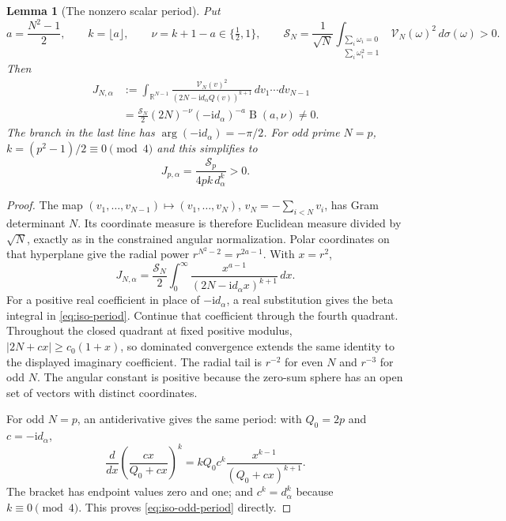\documentclass[11pt]{article}
\numberwithin{equation}{section}
\newtheorem{lemma}[theorem]{Lemma}
\theoremstyle{definition}
\newcommand{\R}{\mathbb R}
\newcommand{\ii}{\mathrm i}
\begin{document}
\begin{lemma}[The nonzero scalar period]
\label{lem:iso-period}
Put
\[
 a=\frac{N^2-1}{2},\qquad k=\lfloor a\rfloor,\qquad
 \nu=k+1-a\in\{\tfrac12,1\},\qquad
 \mathcal S_N=\frac1{\sqrt N}
      \int_{\substack{\sum_i\omega_i=0\\\sum_i\omega_i^2=1}}
           \mathcal V_N(\omega)^2\,d\sigma(\omega)>0.
\]
Then
\begin{align}
 J_{N,\alpha}
  &:=\int_{\R^{N-1}}
     \frac{\mathcal V_N(v)^2}
          {(2N-\ii d_\alpha Q(v))^{k+1}}\,dv_1\cdots dv_{N-1}
          \nonumber\\
  &=\frac{\mathcal S_N}{2}(2N)^{-\nu}
      (-\ii d_\alpha)^{-a}\operatorname B(a,\nu)\ne0.
                                      \label{eq:iso-period}
\end{align}
The branch in the last line has $\arg(-\ii d_\alpha)=-\pi/2$.
For odd prime $N=p$, $k=(p^2-1)/2\equiv0\pmod4$ and this simplifies to
\begin{equation}\label{eq:iso-odd-period}
 J_{p,\alpha}=\frac{\mathcal S_p}{4pk\,d_\alpha^k}>0.
\end{equation}
\end{lemma}
\begin{proof}
The map $(v_1,\ldots,v_{N-1})\mapsto(v_1,\ldots,v_N)$,
$v_N=-\sum_{i<N}v_i$, has Gram determinant $N$.
Its coordinate measure is therefore Euclidean measure divided by
$\sqrt N$, exactly as in the constrained angular normalization.
Polar coordinates on that hyperplane give the radial power
$r^{N^2-2}=r^{2a-1}$.  With $x=r^2$,
\[
 J_{N,\alpha}=\frac{\mathcal S_N}{2}
   \int_0^\infty\frac{x^{a-1}}{(2N-\ii d_\alpha x)^{k+1}}\,dx.
\]
For a positive real coefficient in place of $-\ii d_\alpha$,
a real substitution gives the beta integral in
\eqref{eq:iso-period}.  Continue that coefficient through the fourth
quadrant.  Throughout the closed quadrant at fixed positive modulus,
$|2N+cx|\ge c_0(1+x)$, so dominated convergence extends the same
identity to the displayed imaginary coefficient.  The radial tail
is $r^{-2}$ for even $N$ and $r^{-3}$ for odd $N$.
The angular constant is positive because the zero-sum sphere has
an open set of vectors with distinct coordinates.

For odd $N=p$, an antiderivative gives the same period:
with $Q_0=2p$ and $c=-\ii d_\alpha$,
\[
 \frac{d}{dx}\left(\frac{cx}{Q_0+cx}\right)^k
   =kQ_0c^k\frac{x^{k-1}}{(Q_0+cx)^{k+1}}.
\]
The bracket has endpoint values zero and one; and
$c^k=d_\alpha^k$ because $k\equiv0\pmod4$.
This proves \eqref{eq:iso-odd-period} directly.
\end{proof}
\end{document}
